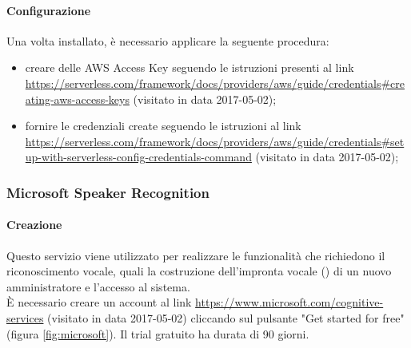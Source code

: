 \paragraph{Configurazione}
Una volta installato, è necessario applicare la seguente procedura:
\begin{itemize}
	\item creare delle AWS Access Key seguendo le istruzioni presenti al link \url{https://serverless.com/framework/docs/providers/aws/guide/credentials#creating-aws-access-keys} (visitato in data 2017-05-02);
	\item fornire le credenziali create seguendo le istruzioni al link \url{https://serverless.com/framework/docs/providers/aws/guide/credentials#setup-with-serverless-config-credentials-command} (visitato in data 2017-05-02);
\end{itemize}

\subsubsection{Microsoft Speaker Recognition}\label{speakerRec}
\paragraph{Creazione}
Questo servizio viene utilizzato per realizzare le funzionalità che richiedono il riconoscimento vocale, quali la costruzione dell'impronta vocale () di un nuovo amministratore e l'accesso al sistema.\\
È necessario creare un account al link \url{https://www.microsoft.com/cognitive-services} (visitato in data 2017-05-02) cliccando sul pulsante "Get started for free" (figura \ref{fig:microsoft}). Il trial gratuito ha durata di 90 giorni.

